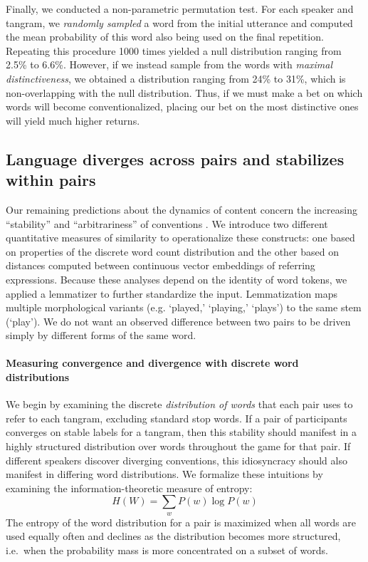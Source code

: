 \documentclass[alpha-refs]{wiley-article}
\begin{document}
Finally, we conducted a non-parametric permutation test.
For each speaker and tangram, we \emph{randomly sampled} a word from the initial utterance and computed the mean probability of this word also being used on the final repetition.
Repeating this procedure 1000 times yielded a null distribution ranging from 2.5\% to 6.6\%.
However, if we instead sample from the words with \emph{maximal distinctiveness}, we obtained a distribution ranging from 24\% to 31\%, which is non-overlapping with the null distribution.
Thus, if we must make a bet on which words will become conventionalized, placing our bet on the most distinctive ones will yield much higher returns.

\subsection{Language diverges across pairs and stabilizes within pairs}

Our remaining predictions about the dynamics of content concern the increasing ``stability'' and ``arbitrariness'' of conventions \cite{Lewis69_Convention}.
We introduce two different quantitative measures of similarity to operationalize these constructs: one based on properties of the discrete word count distribution and the other based on distances computed between continuous vector embeddings of referring expressions. 
Because these analyses depend on the identity of word tokens, we applied a lemmatizer to further standardize the input.
Lemmatization maps multiple morphological variants (e.g. `played,' `playing,' `plays') to the same stem (`play').
We do not want an observed difference between two pairs to be driven simply by different forms of the same word.

\paragraph{Measuring convergence and divergence with discrete word distributions}

We begin by examining the discrete \emph{distribution of words} that each pair uses to refer to each tangram, excluding standard stop words.
If a pair of participants converges on stable labels for a tangram, then this stability should manifest in a highly structured distribution over words throughout the game for that pair.
If different speakers discover diverging conventions, this idiosyncracy should also manifest in differing word distributions.
We formalize these intuitions by examining the information-theoretic measure of entropy: $$H(W) = \sum_w P(w) \log P(w)$$
The entropy of the word distribution for a pair is maximized when all words are used equally often and declines as the distribution becomes more structured, i.e.~when the probability mass is more concentrated on a subset of words.
\end{document}
